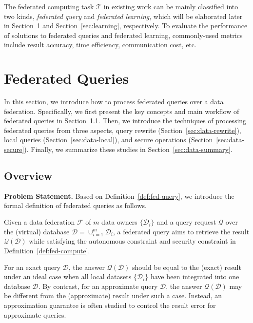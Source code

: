 \documentclass[11pt]{article}
\newcommand{\etc}{etc.\xspace}
\newcommand\secref[1]{Section~\ref{#1}}
\newcommand\defref[1]{Definition~\ref{#1}}
\newcommand{\fakeparagraph}[1]{\vspace{1mm}\noindent\textbf{#1.}}
\newcommand{\FNew}{\mathcal{F}}
\newcommand{\D}{\mathcal{D}}
\newcommand{\Q}{\mathcal{Q}}
\newcommand{\T}{\mathcal{T}}
\begin{document}
The federated computing task $\T$ in existing work can be mainly classified into two kinds, \textit{federated query} and \textit{federated learning}, which will be elaborated later in \secref{sec:data} and \secref{sec:learning}, respectively.
To evaluate the performance of solutions to federated queries and federated learning, commonly-used metrics include result accuracy, time efficiency, communication cost, \etc

\newcommand{\SMCQL}{\textsf{SMCQL}\xspace}
\newcommand{\SAQE}{\textsf{SAQE}\xspace}
\newcommand{\Shrinkwrap}{\textsf{ShrinkWrap}\xspace}
\newcommand{\HuFu}{\textsf{Hu-Fu}\xspace}
\newcommand{\Conclave}{\textsf{Conclave}\xspace}
\newcommand{\Senate}{\textsf{Senate}\xspace}
\newcommand{\Opaque}{\textsf{Opaque}\xspace}

\section{Federated Queries}\label{sec:data}

In this section, we introduce how to process federated queries over a data federation.
Specifically, we first present the key concepts and main workflow of federated queries in \secref{sec:data-overview}.
Then, we introduce the techniques of processing federated queries from three aspects,
query rewrite (\secref{sec:data-rewrite}), local queries (\secref{sec:data-local}), and secure operations (\secref{sec:data-secure}).
Finally, we summarize these studies in \secref{sec:data-summary}.

\subsection{Overview}\label{sec:data-overview}

\fakeparagraph{Problem Statement}
Based on \defref{def:fed-query}, we introduce the formal definition of federated queries as follows.

\begin{definition}\label{def:fed-query}
	Given a data federation $\FNew$ of $m$ data owners $\{\D_i\}$ and a query request $\Q$ over the (virtual) database $\D=\cup_{i=1}^{m}{\D_i}$,
	a federated query aims to retrieve the result $\Q(\D)$ while satisfying the autonomous constraint and security constraint in \defref{def:fed-compute}.
\end{definition}

For an exact query $\D$, the answer $\Q(\D)$ should be equal to the (exact) result under an ideal case when all local datasets $\{\D_i\}$ have been integrated into one database $\D$.
By contrast, for an approximate query $\D$, the answer $\Q(\D)$ may be different from the (approximate) result under such a case.
Instead, an approximation guarantee is often studied to control the result error for approximate queries.
\end{document}
